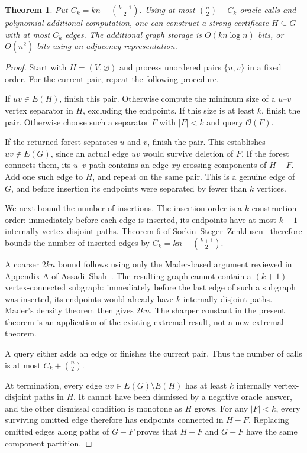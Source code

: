 \documentclass[11pt]{article}
\newtheorem{theorem}{Theorem}[section]
\theoremstyle{remark}\newtheorem{remark}[theorem]{Remark}
\begin{document}
\begin{theorem}\label{thm:sparsifier}
Put $C_k=kn-\binom{k+1}{2}$. Using at most $\binom n2+C_k$ oracle calls and polynomial additional computation, one can construct a strong certificate $H\subseteq G$ with at most $C_k$ edges. The additional graph storage is $O(kn\log n)$ bits, or $O(n^2)$ bits using an adjacency representation.
\end{theorem}
\begin{proof}
Start with $H=(V,\varnothing)$ and process unordered pairs $\{u,v\}$ in a fixed order. For the current pair, repeat the following procedure.

If $uv\in E(H)$, finish this pair. Otherwise compute the minimum size of a $u$--$v$ vertex separator in $H$, excluding the endpoints. If this size is at least $k$, finish the pair. Otherwise choose such a separator $F$ with $|F|<k$ and query $\mathcal O(F)$.

If the returned forest separates $u$ and $v$, finish the pair. This establishes $uv\notin E(G)$, since an actual edge $uv$ would survive deletion of $F$. If the forest connects them, its $u$--$v$ path contains an edge $xy$ crossing components of $H-F$. Add one such edge to $H$, and repeat on the same pair. This is a genuine edge of $G$, and before insertion its endpoints were separated by fewer than $k$ vertices.

We next bound the number of insertions. The insertion order is a $k$-construction order: immediately before each edge is inserted, its endpoints have at most $k-1$ internally vertex-disjoint paths. Theorem 6 of Sorkin--Steger--Zenklusen~\cite{SSZ09} therefore bounds the number of inserted edges by $C_k=kn-\binom{k+1}{2}$.

A coarser $2kn$ bound follows using only the Mader-based argument reviewed in Appendix A of Assadi--Shah~\cite{AS23}. The resulting graph cannot contain a $(k+1)$-vertex-connected subgraph: immediately before the last edge of such a subgraph was inserted, its endpoints would already have $k$ internally disjoint paths. Mader's density theorem then gives $2kn$. The sharper constant in the present theorem is an application of the existing extremal result, not a new extremal theorem.

A query either adds an edge or finishes the current pair. Thus the number of calls is at most $C_k+\binom n2$.

At termination, every edge $uv\in E(G)\setminus E(H)$ has at least $k$ internally vertex-disjoint paths in $H$. It cannot have been dismissed by a negative oracle answer, and the other dismissal condition is monotone as $H$ grows. For any $|F|<k$, every surviving omitted edge therefore has endpoints connected in $H-F$. Replacing omitted edges along paths of $G-F$ proves that $H-F$ and $G-F$ have the same component partition.
\end{proof}
\end{document}
